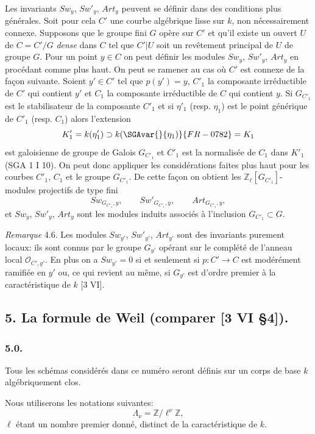 Les
invariants $Sw_y$, $Sw'_y$, $Art_y$ peuvent se définir dans des conditions plus générales. Soit pour cela $C'$ une courbe algébrique lisse sur $k$, non nécessairement connexe. Supposons que le groupe fini $G$ opère sur $C'$ et qu'il existe un ouvert $U$ de $C=C'/G$ \emph{dense} dans $C$ tel que $C'|U$ soit un revêtement principal de $U$ de groupe $G$. Pour un point $y\in C$ on peut définir les modules $Sw_y$, $Sw'_y$, $Art_y$ en procédant comme plus haut. On peut se ramener au cas où $C'$ est connexe de la façon suivante. Soient $y'\in C'$ tel que $p(y')=y$, $C'_1$ la composante irréductible de $C'$ qui contient $y'$ et $C_1$ la composante irréductible de $C$ qui contient $y$. Si $G_{C'_1}$ est le stabilisateur de la composante $C'_1$ et si $\eta'_1$ (resp. $\eta_1$) est le point générique de $C'_1$ (resp. $C_1$) alors l'extension
\[
K'_1=k(\eta'_1)\supset k(\SGAvar{}{\eta_1)}{FR-0782}=K_1
\]
est galoisienne de groupe de Galois $G_{C'_1}$ et $C'_1$ est la normalisée de $C_1$ dans $K'_1$ (SGA 1 I 10). On peut donc appliquer les considérations faites plus haut pour les courbes $C'_1$, $C_1$ et le groupe $G_{C'_1}$. De cette façon on obtient les $\mathbb{Z}_\ell[G_{C'_1}]$-modules projectifs de type fini
\[
Sw_{G_{C'_1},y},\qquad Sw'_{G_{C'_1},y},\qquad Art_{G_{C'_1},y},
\]
et $Sw_y$, $Sw'_y$, $Art_y$ sont les modules induits associés à l'inclusion $G_{C'_1}\subset G$.

\emph{Remarque} 4.6. Les modules $Sw_{y'}$, $Sw'_{y'}$, $Art_{y'}$ sont des invariants purement locaux: ils sont connus par le groupe $G_{y'}$ opérant sur le complété de l'anneau local $\mathcal{O}_{C',y'}$. En plus on a $Sw_{y'}=0$ si et seulement si $p:C'\to C$ est modérément ramifiée en $y'$ ou, ce qui revient au même, si $G_{y'}$ est d'ordre premier à la caractéristique de $k$ [3 VI].

\subsection*{5. La formule de Weil (comparer [3 VI §4]).}

\subsubsection*{5.0.}

Tous les schémas considérés dans ce numéro seront définis sur un corps de base $k$ algébriquement clos.

Nous utiliserons les notations suivantes:
\[
\Lambda_\nu=\mathbb{Z}/\ell^\nu\mathbb{Z},
\]
$\ell$ étant un nombre premier donné, distinct de la caractéristique de $k$.

